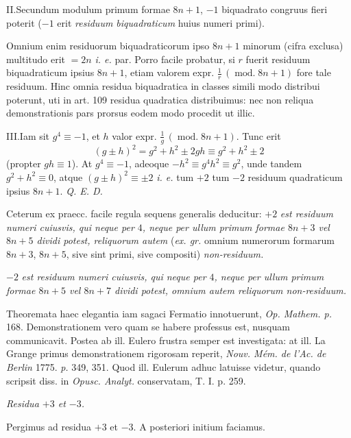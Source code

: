 II.\quad Secundum modulum primum formae $8n+1$, $-1$ biquadrato congruus fieri poterit ($-1$ erit \emph{residuum biquadraticum} huius numeri primi).

Omnium enim residuorum biquadraticorum ipso $8n+1$ minorum (cifra exclusa) multitudo erit $=2n$ \emph{i. e.} par. Porro facile probatur, si $r$ fuerit residuum biquadraticum ipsius $8n+1$, etiam valorem expr. $\frac{1}{r}\,(\operatorname{mod.}8n+1)$ fore tale residuum. Hinc omnia residua biquadratica in classes simili modo distribui poterunt, uti in art. 109 residua quadratica distribuimus: nec non reliqua demonstrationis pars prorsus eodem modo procedit ut illic.

III.\quad Iam sit $g^4\equiv-1$, et $h$ valor expr. $\frac{1}{g}\,(\operatorname{mod.}8n+1)$. Tunc erit
\[
(g\pm h)^2=g^2+h^2\pm2gh\equiv g^2+h^2\pm2
\]
(propter $gh\equiv1$). At $g^4\equiv-1$, adeoque $-h^2\equiv g^4h^2\equiv g^2$, unde tandem $g^2+h^2\equiv0$, atque $(g\pm h)^2\equiv\pm2$ \emph{i. e.} tum $+2$ tum $-2$ residuum quadraticum ipsius $8n+1$. \emph{Q. E. D.}

Ceterum ex praecc. facile regula sequens generalis deducitur: $+2$ \emph{est residuum numeri cuiusvis, qui neque per $4$, neque per ullum primum formae $8n+3$ vel $8n+5$ dividi potest, reliquorum autem} (\emph{ex. gr.} omnium numerorum formarum $8n+3$, $8n+5$, sive sint primi, sive compositi) \emph{non-residuum.}

$-2$ \emph{est residuum numeri cuiusvis, qui neque per $4$, neque per ullum primum formae $8n+5$ vel $8n+7$ dividi potest, omnium autem reliquorum non-residuum.}

Theoremata haec elegantia iam sagaci Fermatio innotuerunt, \emph{Op. Mathem. p.} 168. Demonstrationem vero quam se habere professus est, nusquam communicavit. Postea ab ill. Eulero frustra semper est investigata: at ill. La Grange primus demonstrationem rigorosam reperit, \emph{Nouv. M\'em. de l'Ac. de Berlin} 1775. \emph{p.} 349, 351. Quod ill. Eulerum adhuc latuisse videtur, quando scripsit diss. in \emph{Opusc. Analyt.} conservatam, T. I. p. 259.

\begin{center}\emph{Residua $+3$ et $-3$.}\end{center}

Pergimus ad residua $+3$ et $-3$. A posteriori initium faciamus.

